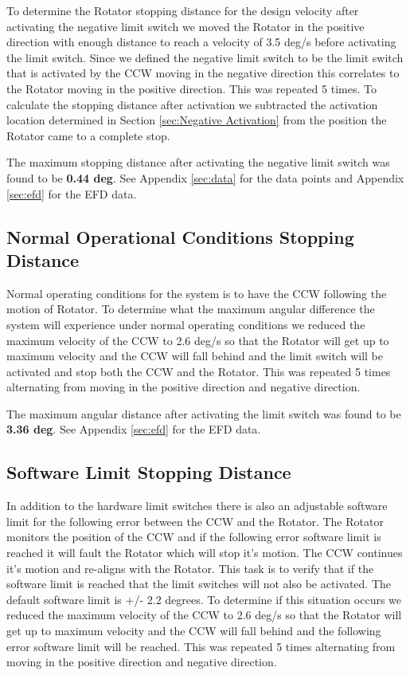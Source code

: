 \documentclass[SE,authoryear,toc, lsstdraft]{lsstdoc}
\begin{document}
To determine the Rotator stopping distance for the design velocity after
activating the negative limit switch we moved the Rotator in the
positive direction with enough distance to reach a velocity of 3.5 deg/s
before activating the limit switch. Since we defined the negative limit
switch to be the limit switch that is activated by the CCW moving in the
negative direction this correlates to the Rotator moving in the positive
direction. This was repeated 5 times. To calculate the stopping
distance after activation we subtracted the activation location
determined in Section \ref{sec:Negative Activation} from the position the Rotator came to a
complete stop.

The maximum stopping distance after activating the negative limit switch
was found to be \textbf{0.44 deg}. See Appendix \ref{sec:data} for the data points
and Appendix \ref{sec:efd} for the EFD data.

\subsection{Normal Operational Conditions Stopping Distance}

Normal operating conditions for the system is to have the CCW following the motion of Rotator.
To determine what the maximum angular difference the system will experience under
normal operating conditions we reduced the maximum velocity of the CCW to 2.6 deg/s so that the Rotator
will get up to maximum velocity and the CCW will fall behind and the limit switch will be activated
and stop both the CCW and the Rotator. This was repeated 5 times alternating from moving in the
positive direction and negative direction.

The maximum angular distance after activating the limit switch
was found to be \textbf{3.36 deg}. See Appendix \ref{sec:efd} for the EFD data.

\subsection{Software Limit Stopping Distance}

In addition to the hardware limit switches there is also an adjustable software limit for the
following error between the CCW and the Rotator. The Rotator monitors the position of the CCW
and if the following error software limit is reached it will fault the Rotator which will stop it's motion.
The CCW continues it's motion and re-aligns with the Rotator. This task is to verify that if the software
limit is reached that the limit switches will not also be activated. The default software limit is +/- 2.2 degrees.
To determine if this situation occurs we reduced the maximum velocity of the CCW to 2.6 deg/s so that
the Rotator will get up to maximum velocity and the CCW will fall behind and the following error software
limit will be reached. This was repeated 5 times alternating from moving in the positive direction
and negative direction.
\end{document}
